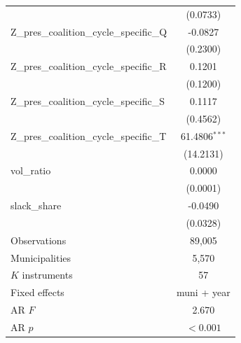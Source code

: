 \begin{tabular}{lc}
 & (0.0733) \\
Z\_pres\_coalition\_cycle\_specific\_Q & -0.0827 \\
 & (0.2300) \\
Z\_pres\_coalition\_cycle\_specific\_R & 0.1201 \\
 & (0.1200) \\
Z\_pres\_coalition\_cycle\_specific\_S & 0.1117 \\
 & (0.4562) \\
Z\_pres\_coalition\_cycle\_specific\_T & 61.4806$^{***}$ \\
 & (14.2131) \\
vol\_ratio & 0.0000 \\
 & (0.0001) \\
slack\_share & -0.0490 \\
 & (0.0328) \\
\midrule
Observations & 89,005 \\
Municipalities & 5,570 \\
$K$ instruments & 57 \\
Fixed effects & muni + year \\
AR $F$ & 2.670 \\
AR $p$ & $<0.001$ \\
\bottomrule
\end{tabular}

